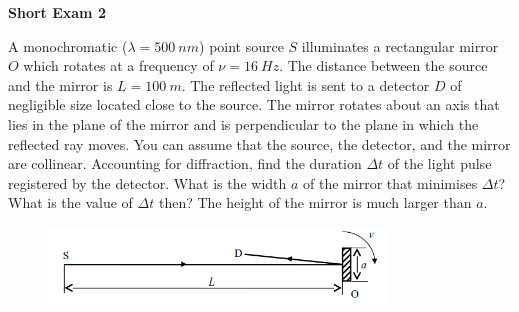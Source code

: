 \documentclass[../TST.tex]{subfiles}
\begin{document}
\begin{large}
	\textbf{Short Exam 2}
\end{large}

\begin{sproblem}
A monochromatic ($\lambda=\qty{500}{nm}$) point source $S$ illuminates a rectangular mirror $O$ which rotates at a frequency of $\nu=\qty{16}{Hz}$. The distance between the source and the mirror is $L=\qty{100}{m}$. The reflected light is sent to a detector $D$ of negligible size located close to the source. The mirror rotates about an axis that lies in the plane of the mirror and is perpendicular to the plane in which the reflected ray moves. You can assume that the source, the detector, and the mirror are collinear. Accounting for diffraction, find the duration $\Delta t$ of the light pulse registered by the detector. What is the width $a$ of the mirror that minimises $\Delta t$? What is the value of $\Delta t$ then? The height of the mirror is much larger than $a$.
\begin{figure}[h]
\centering
\includegraphics[width=0.8\textwidth]{fig/2007_l2.png}
\caption{}
\label{mirr}
\end{figure}
\end{sproblem}
\end{document}
